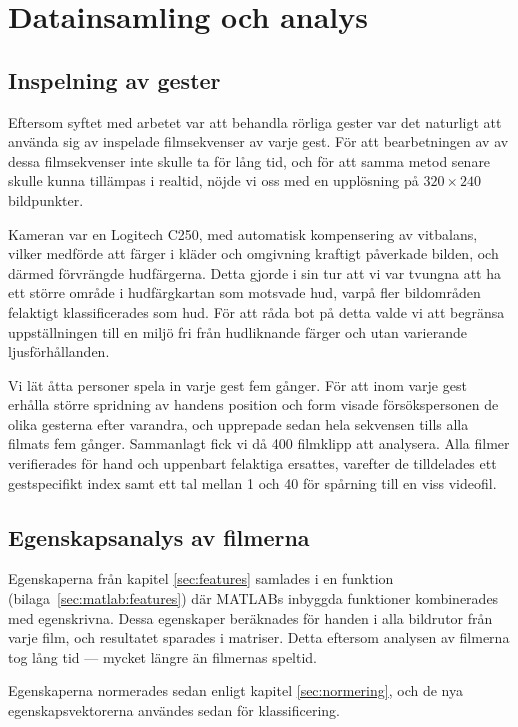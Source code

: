 \documentclass[../rapport_MVEX01-11-05]{subfiles}
\begin{document}
\section{Datainsamling och analys}

\subsection{Inspelning av gester}
Eftersom syftet med arbetet var att behandla rörliga
gester var det naturligt att 
använda sig av inspelade filmsekvenser av varje gest.
För att bearbetningen av av dessa filmsekvenser inte skulle ta för lång tid,
och för att samma metod senare skulle kunna tillämpas i realtid,
nöjde vi oss med en upplösning på $320\times240$ bildpunkter.

Kameran var en Logitech C250, med automatisk kompensering av vitbalans,
vilker medförde att färger i kläder och omgivning kraftigt påverkade bilden,
och därmed förvrängde hudfärgerna. Detta gjorde i sin tur att vi var
tvungna att ha ett större område i hudfärgkartan
som motsvade hud, varpå fler bildområden felaktigt klassificerades som hud.
För att råda
bot på detta valde vi att begränsa uppställningen till en miljö fri från
hudliknande färger och utan varierande ljusförhållanden.

Vi lät åtta personer spela in varje gest fem gånger.
För att inom varje gest erhålla större spridning av handens position och form
visade försökspersonen de olika gesterna efter varandra, och upprepade sedan
hela sekvensen tills alla filmats fem gånger. Sammanlagt fick vi då 400
filmklipp att analysera.
Alla filmer verifierades för hand och uppenbart felaktiga ersattes, varefter
de tilldelades ett gestspecifikt index samt
ett tal mellan 1 och 40 för spårning till en viss videofil.

\subsection{Egenskapsanalys av filmerna}
Egenskaperna från kapitel \ref{sec:features} samlades i en funktion
(bilaga~\ref{sec:matlab:features}) där MATLABs inbyggda funktioner kombinerades
med egenskrivna.
Dessa egenskaper beräknades
för handen i alla bildrutor från varje film, och resultatet
sparades i matriser. Detta eftersom analysen av filmerna tog lång tid
--- mycket längre än filmernas speltid.

Egenskaperna normerades sedan enligt kapitel \ref{sec:normering},
och de nya egenskapsvektorerna användes sedan för klassificering.
\end{document}
